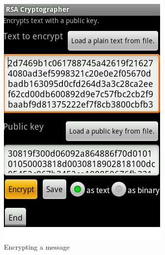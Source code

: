 \documentclass[a4paper,10pt]{report}
\begin{document}
\begin{figure}
        \centering
        \begin{subfigure}[b]{0.45\textwidth}
                \centering
                \includegraphics[width=\textwidth]{cat2.jpg}
                \caption{Encrypting a message}
                \label{fig:cat2}
        \end{subfigure}
	\begin{subfigure}[b]{0.45\textwidth}
                \centering

\end{subfigure}
\end{figure}
\end{document}
